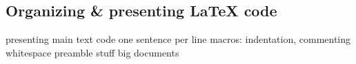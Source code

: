 \documentclass[a4paper,twoside,nofonts]{tufte-handout}
\begin{document}
\subsection{Organizing \& presenting \LaTeX{} code} %
\label{sub:format}

\begin{todoenv}
    presenting main text code
    one sentence per line
    macros: indentation, commenting whitespace
    preamble stuff
    big documents
\end{todoenv}



\clearpage

\nocite{*}


\clearpage\todos
\end{document}
